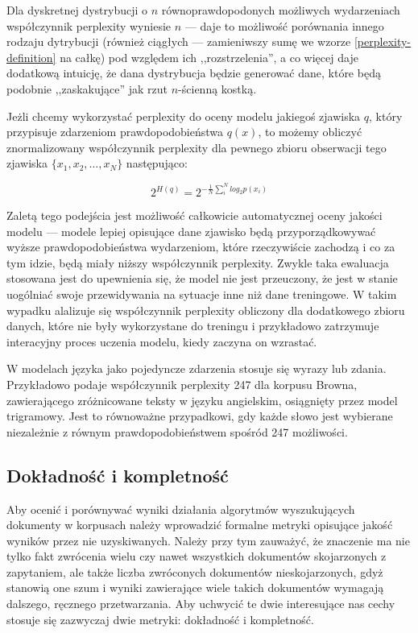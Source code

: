 \documentclass[11pt,a4paper]{article}
\begin{document}
Dla dyskretnej dystrybucji o $n$ równoprawdopodonych możliwych wydarzeniach
współczynnik perplexity wyniesie $n$ --- daje to możliwość porównania innego
rodzaju dytrybucji (również ciągłych --- zamieniwszy sumę we wzorze
\ref{perplexity-definition} na całkę) pod względem ich ,,rozstrzelenia'', a co
więcej daje dodatkową intuicję, że dana dystrybucja będzie generować dane,
które będą podobnie ,,zaskakujące'' jak rzut $n$-ścienną kostką.

Jeżli chcemy wykorzystać perplexity do oceny modelu jakiegoś zjawiska $q$,
który przypisuje zdarzeniom prawdopodobieństwa $q(x)$, to możemy obliczyć
znormalizowany współczynnik perplexity dla pewnego zbioru obserwacji tego zjawiska
$\{x_1, x_2, \ldots, x_N\}$ następująco:

\begin{equation}
  2^{H(q)} = 2^{-\frac{1}{N}\sum_i^N log_2 p(x_i)}
\end{equation}

Zaletą tego podejścia jest możliwość całkowicie automatycznej oceny jakości
modelu --- modele lepiej opisujące dane zjawisko będą przyporządkowywać wyższe
prawdopodobieństwa wydarzeniom, które rzeczywiście zachodzą i co za tym idzie,
będą miały niższy współczynnik perplexity. Zwykle taka ewaluacja stosowana jest
do upewnienia się, że model nie jest przeuczony, że jest w stanie uogólniać
swoje przewidywania na sytuacje inne niż dane treningowe. W takim wypadku
alalizuje się współczynnik perplexity obliczony dla dodatkowego zbioru
danych, które nie były wykorzystane do treningu i przykładowo zatrzymuje
interacyjny proces uczenia modelu, kiedy zaczyna on wzrastać.

W modelach języka jako pojedyncze zdarzenia stosuje się wyrazy lub zdania.
Przykładowo \cite{perplexity-estimate} podaje współczynnik perplexity 247 dla
korpusu Browna, zawierającego zróżnicowane teksty w języku angielskim,
osiągnięty przez model trigramowy. Jest to równoważne przypadkowi, gdy każde
słowo jest wybierane niezależnie z równym prawdopodobieństwem spośród 247
możliwości.

\subsection{Dokładność i kompletność}

Aby ocenić i porównywać wyniki działania algorytmów wyszukujących dokumenty w
korpusach należy wprowadzić formalne metryki opisujące jakość wyników przez
nie uzyskiwanych. Należy przy tym zauważyć, że znaczenie ma nie tylko fakt
zwrócenia wielu czy nawet wszystkich dokumentów skojarzonych z zapytaniem, ale
także liczba zwróconych dokumentów nieskojarzonych, gdyż stanowią one szum i
wyniki zawierające wiele takich dokumentów wymagają dalszego, ręcznego
przetwarzania. Aby uchwycić te dwie interesujące nas cechy stosuje się
zazwyczaj dwie metryki: dokładność i kompletność.
\end{document}
